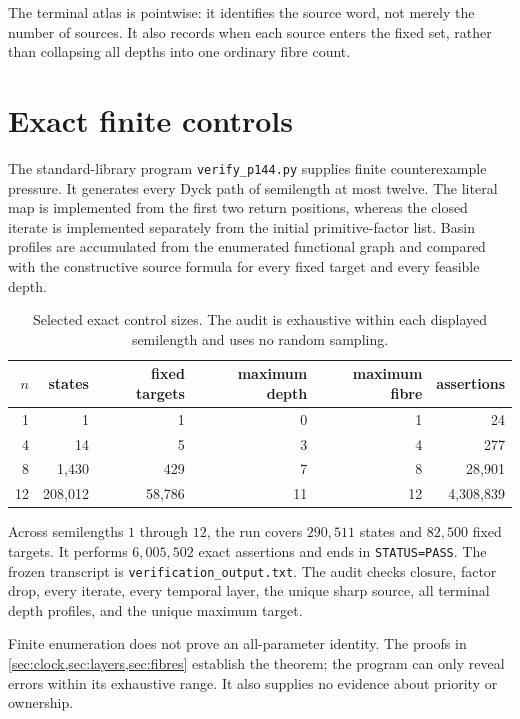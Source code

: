 \documentclass[10pt,a4paper]{amsart}
\theoremstyle{definition}
\theoremstyle{remark}
\begin{document}
The terminal atlas is pointwise: it identifies the source word, not merely the
number of sources.  It also records when each source enters the fixed set,
rather than collapsing all depths into one ordinary fibre count.

\section{Exact finite controls}\label{sec:controls}

The standard-library program \texttt{verify\_p144.py} supplies finite
counterexample pressure.  It generates every Dyck path of semilength at most
twelve.  The literal map is implemented from the first two return positions,
whereas the closed iterate is implemented separately from the initial
primitive-factor list.  Basin profiles are accumulated from the enumerated
functional graph and compared with the constructive source formula for every
fixed target and every feasible depth.

\begin{table}[ht]
\centering
\caption{Selected exact control sizes.  The audit is exhaustive within each
displayed semilength and uses no random sampling.}\label{tab:controls}
\begin{tabular}{@{}rrrrrr@{}}
\toprule
$n$ & states & fixed targets & maximum depth & maximum fibre & assertions\\
\midrule
1  & 1       & 1      & 0  & 1  & 24\\
4  & 14      & 5      & 3  & 4  & 277\\
8  & 1,430   & 429    & 7  & 8  & 28,901\\
12 & 208,012 & 58,786 & 11 & 12 & 4,308,839\\
\bottomrule
\end{tabular}
\end{table}

Across semilengths $1$ through $12$, the run covers $290{,}511$ states and
$82{,}500$ fixed targets.  It performs $6{,}005{,}502$ exact assertions and
ends in \texttt{STATUS=PASS}.  The frozen transcript is
\texttt{verification\_output.txt}.  The audit checks closure, factor drop,
every iterate, every temporal layer, the unique sharp source, all terminal
depth profiles, and the unique maximum target.

Finite enumeration does not prove an all-parameter identity.  The proofs in
\cref{sec:clock,sec:layers,sec:fibres} establish the theorem; the program can
only reveal errors within its exhaustive range.  It also supplies no evidence
about priority or ownership.
\end{document}
